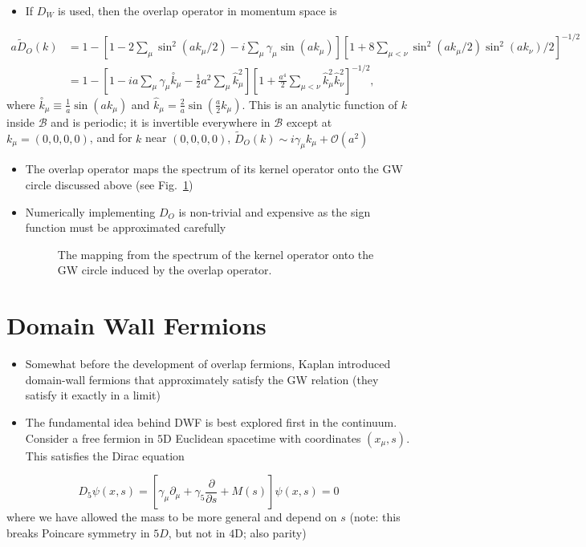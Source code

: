 \begin{itemize}
    \item If $D_W$ is used, then the overlap operator in momentum space is
\end{itemize}
\begin{align}
    a \tilde{D}_O(k) &= 1-[1-2\sum_\mu \sin^2(a k_\mu/2) - i \sum_\mu \gamma_\mu \sin(ak_\mu)][1+8\sum_{\mu<\nu}\sin^2(a k_\mu/2)\sin^2(a k_\nu)/2]^{-1/2}\nonumber \\
    &= 1 - [1 - i a \sum_\mu \gamma_\mu \overset{\circ}k_\mu - \frac{1}{2}a^2 \sum_\mu \hat{k}_\mu^2][1 + \frac{a^4}{2}\sum_{\mu < \nu}\hat{k}_\mu^2 \hat{k}_\nu^2]^{-1/2},
\end{align}
where $\overset{\circ}k_\mu \equiv \frac{1}{a}\sin(a k_\mu)$ and $\hat{k}_\mu = \frac{2}{a}\sin(\frac{a}{2}k_\mu)$. This is an analytic function of $k$ inside $\mathcal{B}$ and is periodic; it is invertible everywhere in $\mathcal{B}$ except at $k_\mu = (0,0,0,0)$, and for $k$ near $(0,0,0,0)$, $\tilde{D}_O(k) \sim i \gamma_\mu k_\mu + \mathcal{O}(a^2)$
\begin{itemize}
  \item The overlap operator maps the spectrum of its kernel operator onto the GW circle discussed above (see Fig.~\ref{fig:overlap_gw_circle})
  \item Numerically implementing \(D_{O}\) is non-trivial and expensive as the sign function must be approximated carefully
\begin{figure}
    \centering
    \caption{The mapping from the spectrum of the kernel operator onto the GW circle induced by the overlap operator.}
    \label{fig:overlap_gw_circle}
\end{figure}
\end{itemize}

\section{Domain Wall Fermions}

  \begin{itemize}
  \item Somewhat before the development of overlap fermions, Kaplan introduced domain-wall fermions that approximately satisfy the GW relation (they satisfy it exactly in a limit)
  \item The fundamental idea behind DWF is best explored first in the continuum. Consider a free fermion in $5$D Euclidean spacetime with coordinates $(x_\mu, s)$. This satisfies the Dirac equation
\end{itemize}
\begin{equation}
    D_5 \psi(x, s) = [\gamma_\mu \partial_\mu + \gamma_5 \frac{\partial}{\partial s} + M(s)] \psi(x,s) = 0
\end{equation}
where we have allowed the mass to be more general and depend on $s$ (note: this breaks Poincare symmetry in $5D$, but not in $4$D; also parity)

